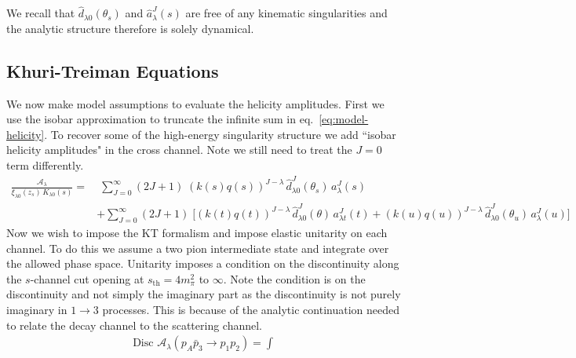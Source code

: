 \documentclass[10pt, aps,prd,amsmath,amssymb,superscriptaddress,onecolumn,
nofootinbib,showpacs,preprintnumbers]{revtex4-1}
\newcommand{\Disc}{\text{Disc }}
\begin{document}
We recall that \(\hat{d}_{\lambda 0}(\theta_s)\) and \(\hat{a}_\lambda^J(s)\) are free of any kinematic singularities and the analytic structure therefore is solely dynamical.
\subsection{Khuri-Treiman Equations} \label{sec:unitarity}
We now make model assumptions to evaluate the helicity amplitudes. First we use the isobar approximation to truncate the infinite sum in eq.~\ref{eq:model-helicity}. To recover some of the high-energy singularity structure we add ``isobar helicity amplitudes" in the cross channel. Note we still need to treat the \(J=0\) term differently.
%
  \begin{align}
    \label{eq:isobar}
    \frac{\mathcal{A}_\lambda}{ \xi_{\lambda0}(z_s) \, K_{\lambda 0}(s)} =& \; \sum_{J=0}^\infty (2J+1) \; (k(s)q(s))^{J-\lambda} \, \hat{d}_{\lambda0}^J(\theta_s) \, a^J_{\lambda}(s) \nonumber  \\
    &+\sum_{J=0}^\infty (2J+1) \; \bigg[(k(t)q(t))^{J-\lambda} \, \hat{d}_{\lambda0}^J(\theta) \, a^J_{\lambda t}(t) + (k(u)q(u))^{J-\lambda} \, \hat{d}_{\lambda0}^J(\theta_u) \, a^J_{\lambda}(u) \bigg]
  \end{align}
%
Now we wish to impose the KT formalism and impose elastic unitarity on each channel. To do this we assume a two pion intermediate state and integrate over the allowed phase space. Unitarity imposes a condition on the discontinuity along the \(s\)-channel cut opening at \(s_{\text{th}} = 4m_\pi^2\) to \(\infty\). Note the condition is on the discontinuity and not simply the imaginary part as the discontinuity is not purely imaginary in \(1 \to 3\) processes. This is because of the analytic continuation needed to relate the decay channel to the scattering channel.
  \begin{align}
    \label{eq:unitarity}
    \Disc \mathcal{A}_\lambda(p_A \bar{p}_3 \to p_1 p_2 ) = \int
  \end{align}
\end{document}
